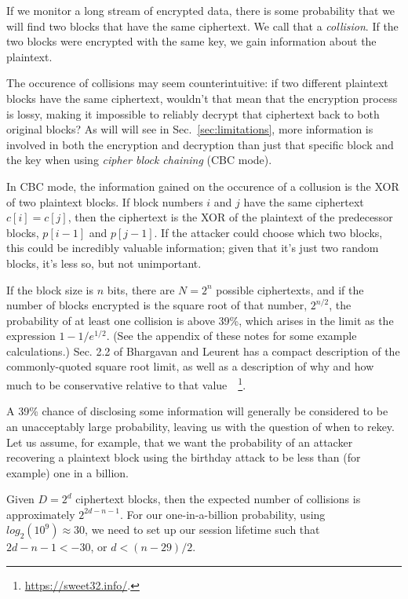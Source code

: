 If we monitor a long stream of encrypted data, there is some
probability that we will find two blocks that have the same
ciphertext.  We call that a \emph{collision}.  If the two blocks were
encrypted with the same key, we gain information about the plaintext.

The occurence of collisions may seem counterintuitive: if two
different plaintext blocks have the same ciphertext, wouldn't that
mean that the encryption process is lossy, making it impossible to
reliably decrypt that ciphertext back to both original blocks?  As
will will see in Sec.~\ref{sec:limitations}, more information is
involved in both the encryption and decryption than just that specific
block and the key when using \emph{cipher block chaining} (CBC mode).

In CBC mode, the information gained on the occurence of a collusion is
the XOR of two plaintext blocks.  If block numbers $i$ and $j$ have
the same ciphertext $c[i] = c[j]$, then the ciphertext is the XOR of
the plaintext of the predecessor blocks, $p[i-1]$ and $p[j-1]$.  If
the attacker could choose which two blocks, this could be incredibly
valuable information; given that it's just two random blocks, it's
less so, but not unimportant.  

If the block size is $n$ bits, there are $N = 2^n$ possible
ciphertexts, and if the number of blocks encrypted is the square root
of that number, $2^{n/2}$, the probability of at least one collision
is above 39\%, which arises in the limit as the expression
$1-1/e^{1/2}$.  (See the appendix of these notes for some example
calculations.)  Sec. 2.2 of Bhargavan and Leurent has a compact
description of the commonly-quoted square root limit, as well as
a description of why and how much to be conservative relative to that
value~\cite{bhargavan2016practical}~\footnote{\url{https://sweet32.info/}.}.

A 39\% chance of disclosing some information will generally be
considered to be an unacceptably large probability, leaving us with
the question of when to rekey.  Let us assume, for example, that we
want the probability of an attacker recovering a plaintext block using
the birthday attack to be less than (for example) one in a billion.

Given $D = 2^d$ ciphertext blocks, then the expected number of
collisions is approximately $2^{2d-n-1}$.  For our one-in-a-billion
probability, using $log_2(10^9) \approx 30$, we need to set up our
session lifetime such that $2d-n-1 < -30$, or $d < (n-29)/2$.

